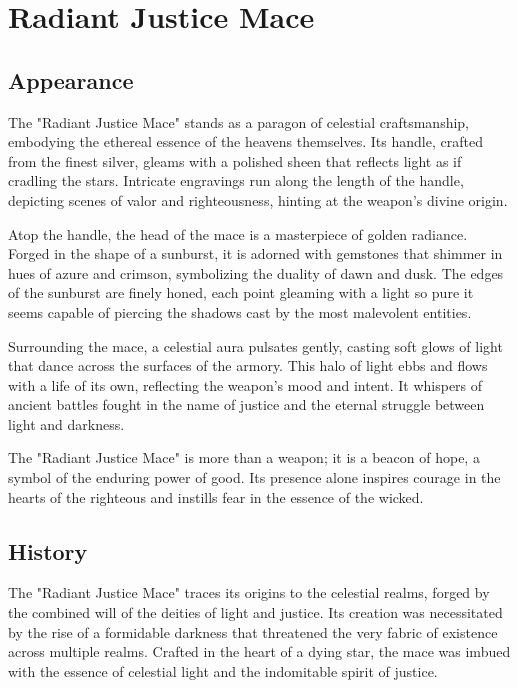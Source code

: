 
\chapter*{Radiant Justice Mace}

\section*{Appearance}
The "Radiant Justice Mace" stands as a paragon of celestial craftsmanship, embodying the ethereal essence of the heavens themselves. Its handle, crafted from the finest silver, gleams with a polished sheen that reflects light as if cradling the stars. Intricate engravings run along the length of the handle, depicting scenes of valor and righteousness, hinting at the weapon's divine origin.

Atop the handle, the head of the mace is a masterpiece of golden radiance. Forged in the shape of a sunburst, it is adorned with gemstones that shimmer in hues of azure and crimson, symbolizing the duality of dawn and dusk. The edges of the sunburst are finely honed, each point gleaming with a light so pure it seems capable of piercing the shadows cast by the most malevolent entities.

Surrounding the mace, a celestial aura pulsates gently, casting soft glows of light that dance across the surfaces of the armory. This halo of light ebbs and flows with a life of its own, reflecting the weapon's mood and intent. It whispers of ancient battles fought in the name of justice and the eternal struggle between light and darkness.

The "Radiant Justice Mace" is more than a weapon; it is a beacon of hope, a symbol of the enduring power of good. Its presence alone inspires courage in the hearts of the righteous and instills fear in the essence of the wicked.

\section*{History}
The "Radiant Justice Mace" traces its origins to the celestial realms, forged by the combined will of the deities of light and justice. Its creation was necessitated by the rise of a formidable darkness that threatened the very fabric of existence across multiple realms. Crafted in the heart of a dying star, the mace was imbued with the essence of celestial light and the indomitable spirit of justice.

